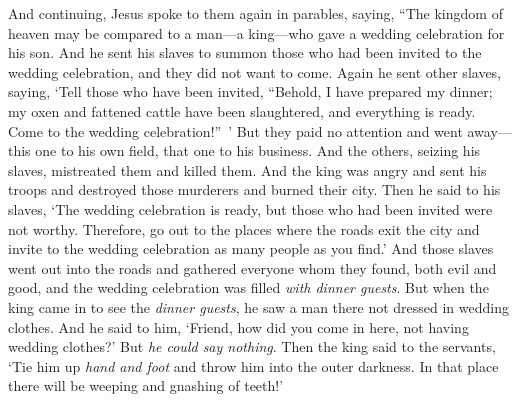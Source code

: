 \begin{biblechapter} %
 And continuing, Jesus spoke to them again in parables, saying,
\verse “The kingdom of heaven may be compared to a man—a king—who gave a wedding celebration for his son.
\verse And he sent his slaves to summon those who had been invited to the wedding celebration, and they did not want to come.
\verse Again he sent other slaves, saying, ‘Tell those who have been invited, “Behold, I have prepared my dinner; my oxen and fattened cattle have been slaughtered, and everything is ready. Come to the wedding celebration!” ’
\verse But they paid no attention and went away—this one to his own field, that one to his business.
\verse And the others, seizing his slaves, mistreated them and killed them.
\verse And the king was angry and sent his troops and destroyed those murderers and burned their city.
\verse Then he said to his slaves, ‘The wedding celebration is ready, but those who had been invited were not worthy.
\verse Therefore, go out to the places where the roads exit the city and invite to the wedding celebration as many people as you find.’
\verse And those slaves went out into the roads and gathered everyone whom they found, both evil and good, and the wedding celebration was filled \textit{with dinner guests}.
\verse But when the king came in to see the \textit{dinner guests}, he saw a man there not dressed in wedding clothes.
\verse And he said to him, ‘Friend, how did you come in here, not having wedding clothes?’ But \textit{he could say nothing}.
\verse Then the king said to the servants, ‘Tie him up \textit{hand and foot} and throw him into the outer darkness. In that place there will be weeping and gnashing of teeth!’

\end{biblechapter}
